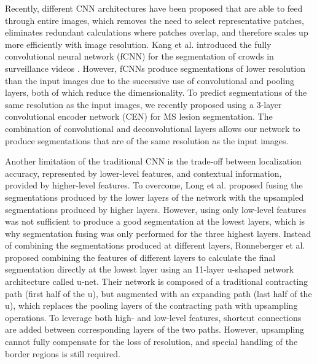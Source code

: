 
Recently, different CNN architectures
\cite{long2015,ronneberger2015,brosch2015,kang2014fully} have been proposed that
are able to feed through entire images, which removes the need to select
representative patches, eliminates redundant calculations where patches overlap,
and therefore scales up more efficiently with image resolution. Kang et al.
introduced the fully convolutional neural network (fCNN) for the segmentation of
crowds in surveillance videos \cite{kang2014fully}. However, fCNNs produce
segmentations of lower resolution than the input images due to the successive
use of convolutional and pooling layers, both of which reduce the
dimensionality.
To predict segmentations of the same resolution as the input images, we recently
proposed using a 3-layer convolutional encoder network (CEN) \cite{brosch2015}
for MS lesion segmentation. The combination of convolutional \cite{LeCun1998}
and deconvolutional \cite{zeiler2011} layers allows our network to produce
segmentations that are of the same resolution as the input images.

Another limitation of the traditional CNN is the trade-off between localization
accuracy, represented by lower-level features, and contextual information,
provided by higher-level features. To overcome, Long et al. \cite{long2015}
proposed fusing the segmentations produced by the lower layers of the network
with the upsampled segmentations produced by higher layers. However, using only
low-level features was not sufficient to produce a good segmentation at the
lowest layers, which is why segmentation fusing was only performed for the three
highest layers. Instead of combining the segmentations produced at
different layers, Ronneberger et al. \cite{ronneberger2015} proposed combining
the features of different layers to calculate the final segmentation
directly at the lowest layer using an 11-layer u-shaped network architecture
called u-net. Their network is
composed of a traditional contracting path (first half of the u), but augmented
with an expanding path (last half of the u), which replaces the pooling layers
of the contracting path with upsampling operations. To leverage both high- and
low-level features, shortcut connections are added between corresponding layers
of the two paths.
However,
upsampling cannot fully compensate for the loss of resolution, and special
handling of the border regions is still required.

